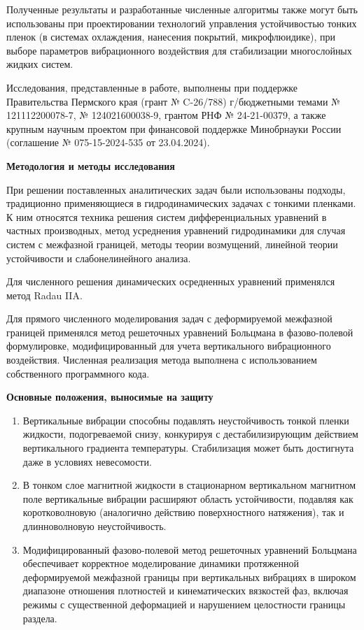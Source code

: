 \documentclass[12pt,a4paper]{article}
\begin{document}
Полученные результаты и разработанные численные алгоритмы также могут быть использованы при проектировании технологий управления устойчивостью тонких пленок (в системах охлаждения, нанесения покрытий, микрофлюидике), при выборе параметров вибрационного воздействия для стабилизации многослойных жидких систем.


Исследования, представленные в работе, выполнены при поддержке Правительства Пермского края (грант № C-26/788) г/бюджетными темами № 121112200078-7, № 124021600038-9, грантом РНФ № 24-21-00379, а также крупным научным проектом при финансовой поддержке Минобрнауки России (соглашение № 075-15-2024-535 от 23.04.2024).

\textbf{Методология и методы исследования}

При решении поставленных аналитических задач были использованы подходы, традиционно применяющиеся в гидродинамических задачах с тонкими пленками. К ним относятся техника решения систем дифференциальных уравнений в частных производных, метод усреднения уравнений гидродинамики для случая систем с межфазной границей, методы теории возмущений, линейной теории устойчивости и слабонелинейного анализа. 

Для численного решения динамических осредненных уравнений применялся метод Radau IIA. 

Для прямого численного моделирования задач с деформируемой межфазной границей применялся метод решеточных уравнений Больцмана в фазово-полевой формулировке, модифицированный для учета вертикального вибрационного воздействия. Численная реализация метода выполнена с использованием собственного программного кода.



\textbf{Основные положения, выносимые на защиту}

\begin{enumerate}
	\item Вертикальные вибрации способны подавлять неустойчивость тонкой пленки жидкости, подогреваемой снизу, конкурируя с дестабилизирующим действием вертикального градиента температуры. Стабилизация может быть достигнута даже в условиях невесомости.
	
	\item В тонком слое магнитной жидкости в стационарном вертикальном магнитном поле вертикальные вибрации расширяют область устойчивости, подавляя как коротковолновую (аналогично действию поверхностного натяжения), так и длинноволновую неустойчивость.
	
	\item Модифицированный фазово-полевой метод решеточных уравнений Больцмана обеспечивает корректное моделирование динамики протяженной деформируемой межфазной границы при вертикальных вибрациях в широком диапазоне отношения плотностей и кинематических вязкостей фаз, включая режимы с существенной деформацией и нарушением целостности границы раздела.
	
\end{enumerate}
\end{document}
